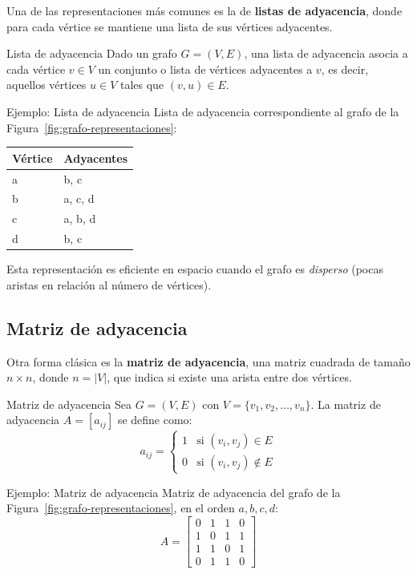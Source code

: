 Una de las representaciones más comunes es la de \textbf{listas de adyacencia}, donde para cada vértice se mantiene una lista de sus vértices adyacentes.

\begin{definitionblock}{Lista de adyacencia}
Dado un grafo \( G = (V, E) \), una lista de adyacencia asocia a cada vértice \( v \in V \) un conjunto o lista de vértices adyacentes a \( v \), es decir, aquellos vértices \( u \in V \) tales que \( (v, u) \in E \).
\end{definitionblock}

\begin{exampleblock}{Ejemplo: Lista de adyacencia}
Lista de adyacencia correspondiente al grafo de la Figura~\ref{fig:grafo-representaciones}:
\begin{center}
\begin{tabular}{l|l}
V\'ertice & Adyacentes \\
\hline
a & b, c \\
b & a, c, d \\
c & a, b, d \\
d & b, c \\
\end{tabular}
\end{center}
\end{exampleblock}

Esta representación es eficiente en espacio cuando el grafo es \emph{disperso} (pocas aristas en relación al número de vértices).

\subsection{Matriz de adyacencia}

Otra forma clásica es la \textbf{matriz de adyacencia}, una matriz cuadrada de tamaño \( n \times n \), donde \( n = |V| \), que indica si existe una arista entre dos vértices.

\begin{definitionblock}{Matriz de adyacencia}
Sea \( G = (V, E) \) con \( V = \{v_1, v_2, \ldots, v_n\} \). La matriz de adyacencia \( A = [a_{ij}] \) se define como:
\[
a_{ij} =
\begin{cases}
1 & \text{si } (v_i, v_j) \in E \\
0 & \text{si } (v_i, v_j) \notin E
\end{cases}
\]
\end{definitionblock}

\begin{exampleblock}{Ejemplo: Matriz de adyacencia}
Matriz de adyacencia del grafo de la Figura~\ref{fig:grafo-representaciones}, en el orden \( a, b, c, d \):
\[
A = \begin{bmatrix}
0 & 1 & 1 & 0 \\
1 & 0 & 1 & 1 \\
1 & 1 & 0 & 1 \\
0 & 1 & 1 & 0
\end{bmatrix}
\]
\end{exampleblock}

